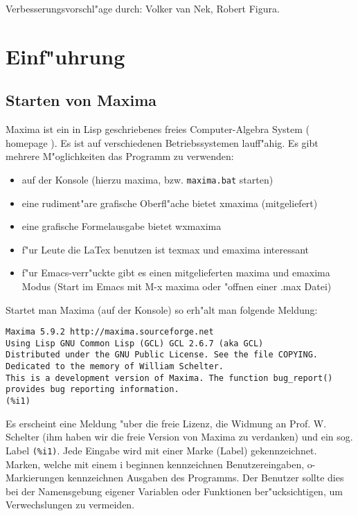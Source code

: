 \documentclass[spanish,12pt,a4paper]{article}
\begin{document}
Verbesserungsvorschl"age durch: Volker van Nek, Robert Figura.

\section{Einf"uhrung}


\subsection{Starten von Maxima}

Maxima ist ein in Lisp geschriebenes freies Computer-Algebra System ( homepage ). Es ist auf verschiedenen Betriebssystemen lauff"ahig. Es gibt mehrere M"oglichkeiten das Programm zu verwenden:

\begin{itemize}
\item auf der Konsole (hierzu maxima, bzw. \verb|maxima.bat| starten)

\item eine rudiment"are grafische Oberfl"ache bietet xmaxima (mitgeliefert)

\item eine grafische Formelausgabe bietet wxmaxima

\item f"ur Leute die LaTex benutzen ist texmax und emaxima interessant

\item f"ur Emacs-verr"uckte gibt es einen mitgelieferten maxima und emaxima Modus (Start im Emacs mit M-x maxima oder "offnen einer .max Datei)
\end{itemize}

Startet man Maxima (auf der Konsole) so erh"alt man folgende Meldung:

\scriptsize
\begin{verbatim}
Maxima 5.9.2 http://maxima.sourceforge.net
Using Lisp GNU Common Lisp (GCL) GCL 2.6.7 (aka GCL)
Distributed under the GNU Public License. See the file COPYING.
Dedicated to the memory of William Schelter.
This is a development version of Maxima. The function bug_report()
provides bug reporting information.
(%i1)
\end{verbatim}
\normalsize

Es erscheint eine Meldung "uber die freie Lizenz, die Widmung an Prof. W. Schelter (ihm haben wir die freie Version von Maxima zu verdanken) und ein sog. Label  \verb|(%i1)|. Jede Eingabe wird mit einer Marke (Label) gekennzeichnet. Marken, welche mit einem i beginnen kennzeichnen Benutzereingaben, o-Markierungen kennzeichnen Ausgaben des Programms. Der Benutzer sollte dies bei der Namensgebung eigener Variablen oder Funktionen ber"ucksichtigen, um Verwechslungen zu vermeiden.
\end{document}
